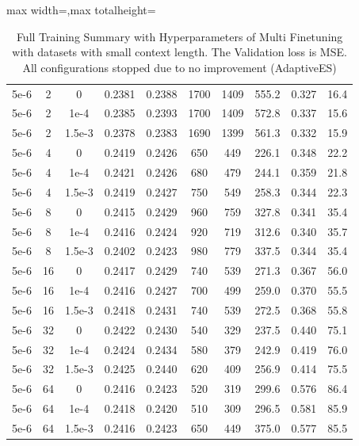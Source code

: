 \begin{table}[p]
\begin{adjustbox}{max width=\textwidth,max totalheight=\textheight}
\begin{tabular}{cccccccccc}
5e-6 &2&0      &0.2381&0.2388&1700&1409&555.2&0.327&16.4\\
5e-6 &2&1e-4   &0.2385&0.2393&1700&1409&572.8&0.337&15.6\\
5e-6 &2&1.5e-3 &0.2378&0.2383&1690&1399&561.3&0.332&15.9\\
5e-6 &4&0      &0.2419&0.2426&650&449&226.1&0.348&22.2\\
5e-6 &4&1e-4   &0.2421&0.2426&680&479&244.1&0.359&21.8\\
5e-6 &4&1.5e-3 &0.2419&0.2427&750&549&258.3&0.344&22.3\\
5e-6 &8&0      &0.2415&0.2429&960&759&327.8&0.341&35.4\\
5e-6 &8&1e-4   &0.2416&0.2424&920&719&312.6&0.340&35.7\\
5e-6 &8&1.5e-3 &0.2402&0.2423&980&779&337.5&0.344&35.4\\
5e-6 &16&0     &0.2417&0.2429&740&539&271.3&0.367&56.0\\
5e-6 &16&1e-4  &0.2416&0.2427&700&499&259.0&0.370&55.5\\
5e-6 &16&1.5e-3&0.2418&0.2431&740&539&272.5&0.368&55.8\\
5e-6 &32&0     &0.2422&0.2430&540&329&237.5&0.440&75.1\\
5e-6 &32&1e-4  &0.2424&0.2434&580&379&242.9&0.419&76.0\\
5e-6 &32&1.5e-3&0.2425&0.2440&620&409&256.9&0.414&75.5\\
5e-6 &64&0     &0.2416&0.2423&520&319&299.6&0.576&86.4\\
5e-6 &64&1e-4  &0.2418&0.2420&510&309&296.5&0.581&85.9\\
5e-6 &64&1.5e-3&0.2416&0.2423&650&449&375.0&0.577&85.5\\
\hline
\end{tabular}
\end{adjustbox}
\caption{Full Training Summary with Hyperparameters of Multi Finetuning with datasets with small context length. The Validation loss is MSE. All configurations stopped due to no improvement (AdaptiveES)}
\end{table}


